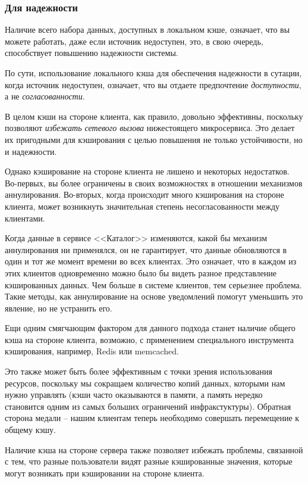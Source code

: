 \documentclass[%
	11pt,
	a4paper,
	utf8,
		]{article}
\begin{document}
\subsubsection{Для надежности}

Наличие всего набора данных, доступных в локальном кэше, означает, что вы можете работать, даже если источник недоступен, это, в свою очередь, способствует повышению надежности системы.

По сути, использование локального кэша для обеспечения надежности в сутации, когда источник недоступен, означает, что вы отдаете предпочтение \emph{доступности}, а не \emph{согласованности}.

В целом кэши на стороне клиента, как правило, довольно эффективны, поскольку позволяют \emph{избежать сетевого вызова} нижестоящего микросервиса. Это делает их пригодными для кэширования с целью повышения не только устойчивости, но и надежности.

Однако кэширование на стороне клиента не лишено и некоторых недостатков. Во-первых, вы более ограничены в своих возможностях в отношении механизмов аннулирования. Во-вторых, когда происходит много кэширования на стороне клиента, может возникнуть значительная степень несогласованности между клиентами.

Когда данные в сервисе <<Каталог>> изменяются, какой бы механизм аннулирования ни применялся, он не гарантирует, что данные обновляются в один и тот же момент времени во всех клиентах. Это означает, что в каждом из этих клиентов одновременно можно было бы видеть разное представление кэшированных данных. Чем больше в системе клиентов, тем серьезнее проблема. Такие методы, как аннулирование на основе уведомлений помогут уменьшить это явление, но не устранить его.

Ещи одним смягчающим фактором для данного подхода станет наличие общего кэша на стороне клиента, возможно, с применением специального инструмента кэширования, например, Redis или memcached.

Это также может быть более эффективным с точки зрения использования ресурсов, поскольку мы сокращаем количество копий данных, которыми нам нужно управлять (кэши часто оказываются в памяти, а память нередко становится одним из самых больших ограничений инфракстуктуры). Обратная сторона медали -- нашим клиентам теперь необходимо совершать перемещение к общему кэшу.

Наличие кэша на стороне сервера также позволяет избежать проблемы, связанной с тем, что разные пользователи видят разные кэшированные значения, которые могут возникать при кэшировании на стороне клиента.
\end{document}
